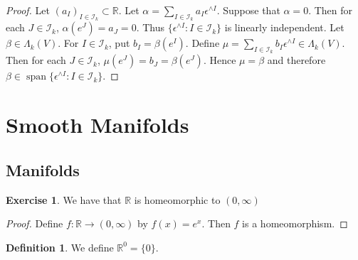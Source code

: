 \documentclass[12pt]{amsart}
\theoremstyle{definition}
\newtheorem{defn}[definition]{Definition}
\newtheorem{ex}[definition]{Exercise}
\newcommand{\al}{\alpha}
\newcommand{\bet}{\beta}
\newcommand{\Lam}{\Lambda}
\newcommand{\ep}{\epsilon}
\newcommand{\R}{\mathbb{R}}
\newcommand{\MI}{\mathcal{I}}
\DeclareMathOperator{\spn}{span}
\begin{document}
	\begin{proof}
		Let $(a_I)_{I \in \MI_k} \subset \R$. Let $\al = \sum\limits_{I \in \MI_k}a_I \ep^{\wedge I} $. Suppose that $\al = 0$. Then for each $J \in \MI_k$, $\al(e^J) = a_J = 0$. Thus $\{\ep^{\wedge I} : I \in \MI_k\}$ is linearly independent. Let $\bet \in \Lam_k(V)$. For $I \in \MI_k$, put $b_I = \bet(e^I)$. Define $\mu = \sum\limits_{I \in \MI_k} b_I\ep^{\wedge I} \in \Lam_k(V)$. Then for each $J \in \MI_k$, $\mu(e^J) = b_J = \bet(e^J)$. Hence $\mu = \bet$ and therefore $\bet \in \spn \{\ep^{\wedge I} :I \in \MI_k\}$.
	\end{proof}
	
	
	
	
	
	
	
	
	
	
	
	
	
	
	
	
	
	
	
	
	
	
	
	
	
	
	
	
	
	
	
	
	
	
	
	
	
	
	

	\newpage
	
	\section{Smooth Manifolds}
	
	\subsection{Manifolds}
	
	\begin{ex}
		We have that $\R$ is homeomorphic to $(0, \infty)$
	\end{ex}

	\begin{proof}
		Define $f: \R \rightarrow (0,\infty)$ by $f(x) = e^x$. Then $f$ is a homeomorphism.
	\end{proof}

	\begin{defn}
		We define $\R^0 = \{0\}$.
	\end{defn}
	
\end{document}
